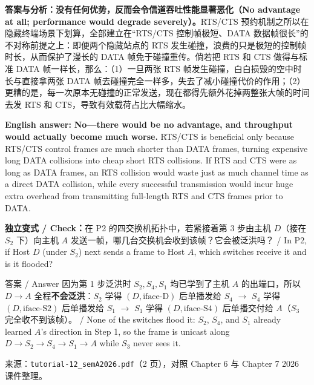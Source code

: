 \textbf{答案与分析：}\textbf{没有任何优势，反而会令信道吞吐性能显著恶化（No advantage at all; performance would degrade severely）。}RTS/CTS 预约机制之所以在隐藏终端场景下划算，全部建立在“RTS/CTS 控制帧极短、DATA 数据帧很长”的不对称前提之上：即便两个隐藏站点的 RTS 发生碰撞，浪费的只是极短的控制帧时长，从而保护了漫长的 DATA 帧免于碰撞重传。倘若把 RTS 和 CTS 做得与标准 DATA 帧一样长，那么：（1）一旦两张 RTS 帧发生碰撞，白白损毁的空中时长与直接拿两张 DATA 帧去碰撞完全一样多，失去了减小碰撞代价的作用；（2）更糟的是，每一次原本无碰撞的正常发送，现在都得先额外花掉两整张大帧的时间去发 RTS 和 CTS，导致有效载荷占比大幅缩水。

\textbf{English answer:} \textbf{No—there would be no advantage, and throughput would actually become much worse.} RTS/CTS is beneficial only because RTS/CTS control frames are much shorter than DATA frames, turning expensive long DATA collisions into cheap short RTS collisions. If RTS and CTS were as long as DATA frames, an RTS collision would waste just as much channel time as a direct DATA collision, while every successful transmission would incur huge extra overhead from transmitting full-length RTS and CTS frames prior to DATA.

\textbf{独立变式 / Check：}在 P2 的四交换机拓扑中，若紧接着第 3 步由主机 $D$（接在 $S_2$ 下）向主机 $A$ 发送一帧，哪几台交换机会收到该帧？它会被泛洪吗？ / In P2, if Host $D$ (under $S_2$) next sends a frame to Host $A$, which switches receive it and is it flooded?

\begin{StudySolution}{答案 / Answer}
因为第 1 步泛洪时 $S_2, S_4, S_1$ 均已学到了主机 $A$ 的出端口，所以 $D\to A$ 全程\textbf{不会泛洪}：$S_2$ 学得 $(D,\text{iface-D})$ 后单播发给 $S_4$ $\to$ $S_4$ 学得 $(D,\text{iface-S2})$ 后单播发给 $S_1$ $\to$ $S_1$ 学得 $(D,\text{iface-S4})$ 后单播交付给 $A$（$S_3$ 完全收不到该帧）。 / None of the switches flood it: $S_2$, $S_4$, and $S_1$ already learned $A$'s direction in Step 1, so the frame is unicast along $D \to S_2 \to S_4 \to S_1 \to A$ while $S_3$ never sees it.
\end{StudySolution}

来源：\texttt{tutorial-12\_semA2026.pdf}（2 页），对照 Chapter 6 与 Chapter 7 2026 课件整理。
